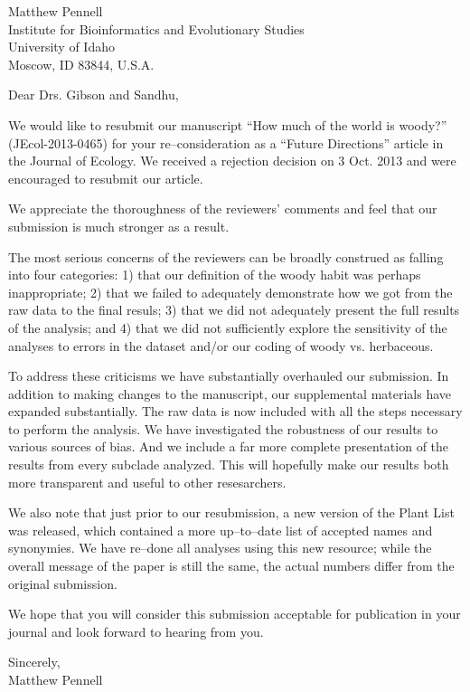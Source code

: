 \documentclass[a4paper,12pt]{article}
\begin{document}
{\raggedleft
  Matthew Pennell\\
  Institute for Bioinformatics and Evolutionary Studies\\
  University of Idaho\\
 Moscow, ID 83844, U.S.A.\\[2ex]
}

\vspace{3ex}

Dear Drs. Gibson and Sandhu,

We would like to resubmit our manuscript ``How much of the world is woody?'' (JEcol-2013-0465) 
for your re--consideration as a ``Future Directions'' article in the Journal of Ecology.
We received a rejection decision on 3 Oct. 2013 and were encouraged to resubmit our article.

We appreciate the thoroughness of the reviewers' comments and feel that our submission is much 
stronger as a result.

The most serious concerns of the reviewers can be broadly construed as falling into four categories:
1) that our definition of the woody habit was perhaps inappropriate; 2) that we failed to adequately
demonstrate how we got from the raw data to the final resuls; 3) that we did not adequately 
present the full results of the analysis; and 4) that we did not sufficiently explore the sensitivity
of the analyses to errors in the dataset and/or our coding of woody vs. herbaceous.

To address these criticisms we have substantially overhauled our submission. In addition to making changes
to the manuscript, our supplemental materials have expanded substantially. The raw data is now
included with all the steps necessary to perform the analysis. We have investigated the robustness of 
our results to various sources of bias. And we include a far more complete presentation of the results
from every subclade analyzed. This will hopefully make our results both more transparent and useful
to other resesarchers.

We also note that just prior to our resubmission, a new version of the Plant List was released, which
contained a more up--to--date list of accepted names and synonymies. We have re--done all analyses using this new 
resource; while the overall message of the paper is still the same, the actual numbers differ from
the original submission. 
 
We hope that you will consider this submission acceptable for publication in your journal and 
look forward to hearing from you.


\begin{flushright}
\vspace{2ex}
\hspace{.2\textwidth}Sincerely,\\
\hspace*{.3\textwidth}
Matthew Pennell
\end{flushright}
\end{document}
